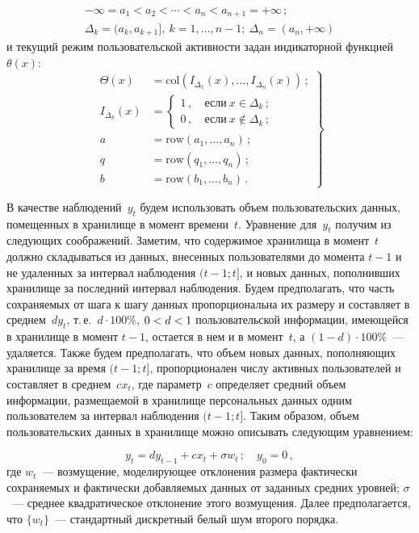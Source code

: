\begin{multicols}{2}
\noindent
\begin{gather*}
-\infty =a_1<a_2<\cdots <a_n<a_{n+1}=+\infty\,;\\
\Delta_k=(a_k,a_{k+1}],\ k=1,\ldots ,n-1;\ \Delta_n=(a_n,+\infty)
\end{gather*}
и текущий режим пользовательской активности задан индикаторной функцией~$\theta(x)$:
\begin{equation}
\left.
\begin{array}{rl}
\Theta(x) &=\mathrm{col}\left( I_{\Delta_1}(x),\ldots ,I_{\Delta_n}(x)\right)\,;\\[6pt]
I_{\Delta_k} (x)&= \begin{cases}
1\,, &\ \mbox{если}\ x\in \Delta_k\,;\\[6pt]
0\,, &\ \mbox{если}\ x\not\in \Delta_k\,;
\end{cases}\\[12pt]
a&=\mathrm{row}\left (a_1,\ldots , a_n\right)\,;\\[6pt]
q&=\mathrm{row}\left (q_1,\ldots  ,q_n\right)\,;\\[6pt]
b&=\mathrm{row}\left (b_1,\ldots ,b_n\right)\,.
\end{array}
\right\}
\label{e2bos}
\end{equation}
  
  В качестве наблюдений~$y_t$ будем использовать объем пользовательских данных, 
помещенных в хранилище в момент времени~$t$. Уравнение для~$y_t$ получим из 
следующих соображений. Заметим, что содержимое хранилища в момент~$t$ должно 
складываться из данных, внесенных пользователями до момента $t-1$ и не удаленных за 
интервал наблюдения $(t-1;t]$, и новых данных, пополнивших хранилище за последний 
интервал наблюдения. Будем предполагать, что часть сохраняемых от шага к шагу данных 
пропорциональна их размеру и составляет в среднем~$dy_t$, т.\,е.\ $d\cdot 100\%$, 
$0\hm<d\hm<1$ пользовательской информации, имеющейся в хранилище в момент $t-1$, 
остается в нем и в момент~$t$, а $(1-d)\cdot100\%$~--- удаляется. Также будем предполагать, что 
объем новых данных, пополняющих хранилище за время $(t-1;t]$, пропорционален числу 
активных пользователей и составляет в среднем~$cx_t$, где параметр~$c$ определяет средний 
объем информации, размещаемой в хранилище персональных данных одним пользователем 
за интервал наблюдения $(t-1;t]$. Таким образом, объем пользовательских данных в 
хранилище можно описывать следующим уравнением:

\noindent
    \begin{equation}
    y_t=dy_{t-1}+cx_t+\sigma w_t\,;\quad y_0=0\,,
    \label{e3bos}
    \end{equation}
где $w_t$~--- возмущение, моделирующее отклонения размера фактически сохраняемых и 
фактически добавляемых данных от заданных средних уровней; $\sigma$~--- среднее 
квадратическое отклонение этого возмущения. Далее предполагается, что $\{w_t\}$~--- 
стандартный дискретный белый шум второго порядка.
  

\end{multicols}
